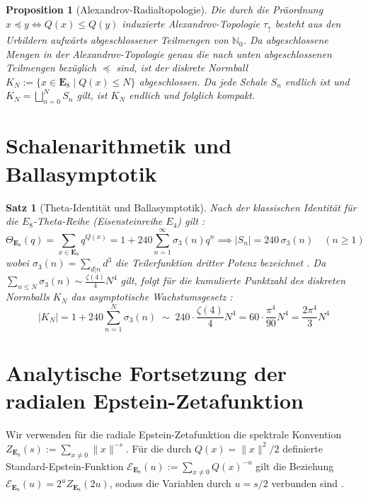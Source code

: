 \documentclass[11pt,a4paper]{article}
\newtheorem{proposition}{Proposition}
\newtheorem{theorem}{Satz}
\begin{document}
	\begin{proposition}[Alexandrov-Radialtopologie]
		Die durch die Präordnung $x \preceq y \iff Q(x) \le Q(y)$ induzierte Alexandrov-Topologie $\tau_{\uparrow}$ besteht aus den Urbildern aufwärts abgeschlossener Teilmengen von $\mathbb{N}_0$. Da abgeschlossene Mengen in der Alexandrov-Topologie genau die nach unten abgeschlossenen Teilmengen bezüglich $\preceq$ sind, ist der diskrete Normball $K_N := \{x \in \mathbf{E}_8 \mid Q(x) \le N\}$ abgeschlossen. Da jede Schale $S_n$ endlich ist und $K_N = \bigsqcup_{n=0}^N S_n$ gilt, ist $K_N$ endlich und folglich kompakt.
	\end{proposition}
	
	\section{Schalenarithmetik und Ballasymptotik}
	
	\begin{theorem}[Theta-Identität und Ballasymptotik]
		\label{thm:theta}
		Nach der klassischen Identität für die $E_8$-Theta-Reihe (Eisensteinreihe $E_4$) gilt \cite{serre1973}:
		$$\Theta_{\mathbf{E}_8}(q) = \sum_{x \in \mathbf{E}_8} q^{Q(x)} = 1 + 240 \sum_{n=1}^{\infty} \sigma_3(n) q^n \implies |S_n| = 240 \, \sigma_3(n) \quad (n \ge 1)$$
		wobei $\sigma_3(n) = \sum_{d|n} d^3$ die Teilerfunktion dritter Potenz bezeichnet \cite{apostol1976}. Da $\sum_{n \le N} \sigma_3(n) \sim \frac{\zeta(4)}{4} N^4$ gilt, folgt für die kumulierte Punktzahl des diskreten Normballs $K_N$ das asymptotische Wachstumsgesetz \cite{apostol1976}:
		$$|K_N| = 1 + 240 \sum_{n=1}^{N} \sigma_3(n) \;\sim\; 240 \cdot \frac{\zeta(4)}{4} N^4 = 60 \cdot \frac{\pi^4}{90} N^4 = \frac{2\pi^4}{3} N^4$$
	\end{theorem}
	
	\section{Analytische Fortsetzung der radialen Epstein-Zetafunktion}
	
	Wir verwenden für die radiale Epstein-Zetafunktion die spektrale Konvention $Z_{\mathbf{E}_8}(s) := \sum_{x \neq 0} \|x\|^{-s}$. Für die durch $Q(x) = \|x\|^2/2$ definierte Standard-Epstein-Funktion $\mathcal{E}_{\mathbf{E}_8}(u) := \sum_{x \neq 0} Q(x)^{-u}$ gilt die Beziehung $\mathcal{E}_{\mathbf{E}_8}(u) = 2^u Z_{\mathbf{E}_8}(2u)$, sodass die Variablen durch $u = s/2$ verbunden sind \cite{terras1985}.
	
\end{document}
